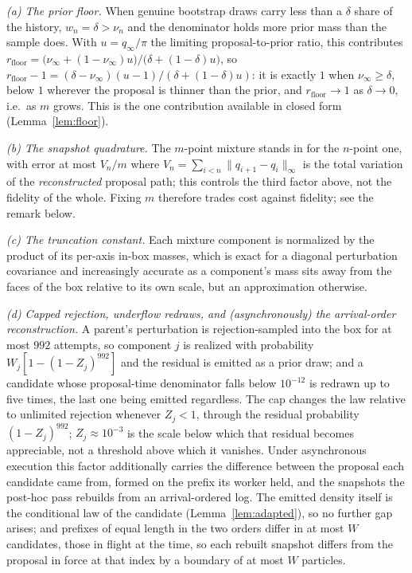 \documentclass[10pt]{article}
\theoremstyle{plain}
\theoremstyle{definition}
\begin{document}
\emph{(a) The prior floor.} When genuine bootstrap draws carry less than a $\delta$ share of the history, $w_n=\delta>\nu_n$ and the denominator holds more prior mass than the sample does. With $u=q_\infty/\pi$ the limiting proposal-to-prior ratio, this contributes
$r_{\mathrm{floor}}=\bigl(\nu_\infty+(1-\nu_\infty)u\bigr)/\bigl(\delta+(1-\delta)u\bigr)$, so $r_{\mathrm{floor}}-1=(\delta-\nu_\infty)(u-1)/(\delta+(1-\delta)u)$: it is exactly $1$ when $\nu_\infty\ge\delta$, below $1$ wherever the proposal is thinner than the prior, and $r_{\mathrm{floor}}\to1$ as $\delta\to0$, i.e.\ as $m$ grows. This is the one contribution available in closed form (Lemma~\ref{lem:floor}).

\emph{(b) The snapshot quadrature.} The $m$-point mixture stands in for the $n$-point one, with error at most $V_n/m$ where $V_n=\sum_{i<n}\|q_{i+1}-q_i\|_\infty$ is the total variation of the \emph{reconstructed} proposal path; this controls the third factor above, not the fidelity of the whole. Fixing $m$ therefore trades cost against fidelity; see the remark below.

\emph{(c) The truncation constant.} Each mixture component is normalized by the product of its per-axis in-box masses, which is exact for a diagonal perturbation covariance and increasingly accurate as a component's mass sits away from the faces of the box relative to its own scale, but an approximation otherwise.

\emph{(d) Capped rejection, underflow redraws, and (asynchronously) the arrival-order reconstruction.} A parent's perturbation is rejection-sampled into the box for at most $992$ attempts, so component $j$ is realized with probability $W_j[1-(1-Z_j)^{992}]$ and the residual is emitted as a prior draw; and a candidate whose proposal-time denominator falls below $10^{-12}$ is redrawn up to five times, the last one being emitted regardless. The cap changes the law relative to unlimited rejection whenever $Z_j<1$, through the residual probability $(1-Z_j)^{992}$; $Z_j\approx10^{-3}$ is the scale below which that residual becomes appreciable, not a threshold above which it vanishes. Under asynchronous execution this factor additionally carries the difference between the proposal each candidate came from, formed on the prefix its worker held, and the snapshots the post-hoc pass rebuilds from an arrival-ordered log. The emitted density itself is the conditional law of the candidate (Lemma~\ref{lem:adapted}), so no further gap arises; and prefixes of equal length in the two orders differ in at most $W$ candidates, those in flight at the time, so each rebuilt snapshot differs from the proposal in force at that index by a boundary of at most $W$ particles.
\end{document}

